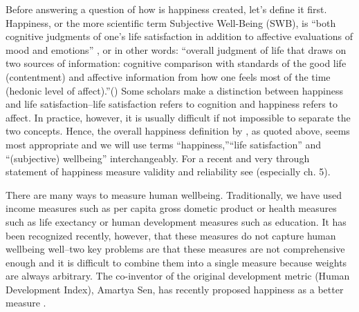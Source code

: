 \documentclass[10pt, letterpaper]{article}
\begin{document}
\begin{spacing}{1.4}
Before answering a question of how is happiness created, let's define it first. 
  Happiness, or the more scientific term Subjective Well-Being (SWB), is ``both cognitive judgments of one's life
satisfaction in addition to affective evaluations of mood and
emotions'' \cite[p. 142]{steel08},  or in other words: ``overall judgment of life that draws on two sources of information:
  cognitive comparison with standards of the good life (contentment) and
  affective information from how one feels most of the time (hedonic
  level of affect).''(\cite[p. 2]{veenhoven08})
 Some scholars make a
  distinction between happiness and life satisfaction--life
  satisfaction refers to cognition and happiness refers to affect. In practice,
  however, it is usually difficult  if not impossible to separate the two
  concepts.  Hence, the overall happiness definition by 
   \cite{veenhoven08}, as quoted above,  seems most appropriate and we will use terms
   ``happiness,''``life satisfaction'' and ``(subjective) wellbeing'' interchangeably.  For a recent and very through statement of
happiness measure validity and reliability see \cite{diener09}
(especially ch. 5). 

There are many ways to measure human wellbeing. Traditionally, we have used
income measures such as per capita gross dometic product or health measures such
as life exectancy or human development measures such as education. %
 It has been recognized recently, however, that these measures do not capture
 human wellbeing well--two key problems are that these measures are not
 comprehensive enough and it is difficult to combine them into a single measure
 because weights are always arbitrary. The co-inventor of the original
 development metric (Human Development Index), Amartya Sen, has recently
 proposed happiness as a better measure \cite{stiglitz09al}.


\end{spacing}
\end{document}
